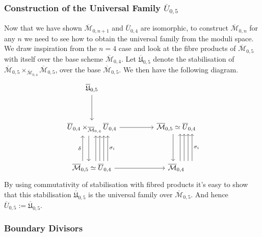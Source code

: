 \subsubsection{Construction of the Universal Family $\overline{U}_{0,5}$}
Now that we have shown $\overline{\mathcal{M}}_{0,n+1}$ and $\overline{U}_{0,4}$ are isomorphic, to construct $\overline{\mathcal{M}}_{0,n}$ for any $n$ we need to see how to obtain the universal family from the moduli space.
We draw inspiration from the $n=4$ case and look at the fibre products of $\overline{\mathcal{M}}_{0,5}$ with itself over the base scheme $\overline{\mathcal{M}}_{0,4}$.
Let $\overline{\mathfrak{U}}_{0,5}$ denote the stabilisation of $\overline{\mathcal{M}}_{0,5} \times_{\overline{\mathcal{M}}_{0,4}} \overline{\mathcal{M}}_{0,5}$, over the base $\overline{\mathcal{M}}_{0,5}$. 
We then have the following diagram.
\[
\begin{tikzcd}
    \overline{\mathfrak{U}}_{0,5} & & \\
    \\
    \overline{U}_{0,4} \times_{\overline{\mathcal{M}}_{0,4}} \overline{U}_{0,4} & & \overline{\mathcal{M}}_{0,5} \simeq \overline{U}_{0,4} \\
    \\
    \overline{\mathcal{M}}_{0,5} \simeq \overline{U}_{0,4} & & \overline{\mathcal{M}}_{0,4}
    \arrow[from = 1-1, to = 3-1]
    \arrow[from = 3-1, to = 3-3]
    \arrow[from = 3-1, to = 5-1, xshift = -1ex]
    \arrow[from = 5-1, to = 5-3]
    \arrow[from = 3-3, to = 5-3, xshift = -1ex]
    \arrow[from = 5-1, to = 3-1, xshift = 1.3ex]
    \arrow[from = 5-1, to = 3-1, xshift = 2.6ex]
    \arrow[from = 5-1, to = 3-1, xshift = 3.9ex]
    \arrow[swap, "\sigma_{i}",from = 5-1, to = 3-1, xshift = 5.2ex]
    \arrow["\delta", from = 5-1, to = 3-1, xshift = -3ex]
    \arrow[from = 5-3, to = 3-3, xshift = 1.3ex]
    \arrow[from = 5-3, to = 3-3, xshift = 2.6ex]
    \arrow[from = 5-3, to = 3-3, xshift = 3.9ex]
    \arrow[swap, "\sigma_{i}",from = 5-3, to = 3-3, xshift = 5.2ex]
\end{tikzcd}
\]
By using commutativity of stabilisation with fibred products it's easy to show that this stabilisation $\overline{\mathfrak{U}}_{0,5}$ is the universal family over $\overline{\mathcal{M}}_{0,5}$.
And hence $\overline{U}_{0,5}:=\overline{\mathfrak{U}}_{0,5}$.
\subsubsection{Boundary Divisors}

